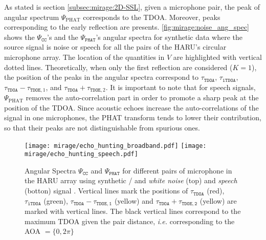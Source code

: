 \mynewline
As stated is section \ref{subsec:mirage:2D-SSL}, given a microphone pair, the peak of angular spectrum $\Psi_\text{PHAT}$ corresponds to the \ac{TDOA}.
Moreover, peaks corresponding to the early reflection are presents.
\cref{fig:mirage:noise_ang_spec} shows the $\Psi_\mathtt{CC}$'s and the $\Psi_\mathtt{PHAT}$'s angular spectra for synthetic data where the source signal is noise or speech for all the pairs of the HARU's circular microphone array.
The location of the quantities in $V$ are highlighted with vertical dotted lines.
Theoretically, when only the first reflection are considered ($K=1$), the position of the peaks in the angular spectra correspond to
$\tau_\mathtt{TDOA}$, $\tau_\mathtt{iTDOA}$, $\tau_\mathtt{TDOA} - \tau_{\mathtt{TDOE}, 1}$, and $\tau_\mathtt{TDOA} + \tau_{\mathtt{TDOE}, 2}$.
It is important to note that for speech signals, $\Psi_\text{PHAT}$ removes the auto-correlation part in order to promote a sharp peak at the position of the \ac{TDOA}.
Since acoustic echoes increase the auto-correlations of the signal in one microphones, the \ac{PHAT} transform tends to lower their contribution, so that their peaks are not distinguishable from spurious ones.
\begin{figure}
    \begin{fullwidth}
        \centering
        \texttt{[image: mirage/echo\_hunting\_broadband.pdf]}
        \texttt{[image: mirage/echo\_hunting\_speech.pdf]}
        \caption{
            Angular Spectra $\Psi_\mathtt{CC}$ and $\Psi_\texttt{PHAT}$ for different pairs of microphone in the HARU array using synthetic \RIRs/ and \textit{white noise} (top) and \textit{speech} (botton) signal .
            Vertical lines mark the positions of  $\tau_\mathtt{TDOA}$ (red), $\tau_\mathtt{iTDOA}$ (green), $\tau_\mathtt{TDOA}-\tau_\mathtt{TDOE,1}$ (yellow) and $\tau_\mathtt{TDOA}+\tau_\mathtt{TDOE,2}$ (yellow) are marked with vertical lines.
            The black vertical lines correspond to the maximum TDOA given the pair distance, \textit{i.e.} corresponding to the AOA $ = \{0, 2\pi\}$}
        \label{fig:mirag:noise_ang_spec}
    \end{fullwidth}
\end{figure}


